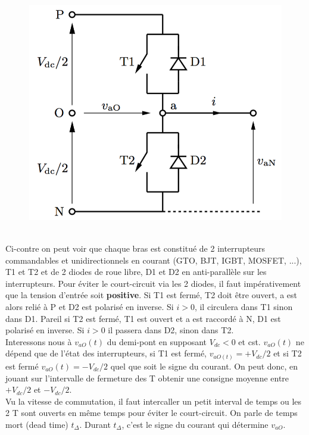 		\begin{figure}
		\vspace{-5mm}
		\includegraphics[scale=0.3]{ch4/8}
		\end{figure}
		\ \\ Ci-contre on peut voir que chaque bras est constitué de 2 interrupteurs commandables et unidirectionnels en courant (GTO, BJT, IGBT, MOSFET, ...), T1 et T2 et de 2 diodes de roue libre, D1 et D2 en  anti-parallèle sur les interrupteurs. Pour éviter le court-circuit via les 2 diodes, il faut impérativement que la tension d'entrée soit \textbf{positive}. Si T1 est fermé, T2 doit être ouvert, a est alors relié à P et D2 est polarisé en inverse. Si $i>0$, il circulera dans T1 sinon dans D1. Pareil si T2 est fermé, T1 est ouvert et a est raccordé à N, D1 est polarisé en inverse. Si $i>0$ il passera dans D2, sinon dans T2. \\
		
		Interessons nous à $v_{aO}(t)$ du demi-pont en supposant $V_{dc}<0$ et cst. $v_{aO}(t)$ ne dépend que de l'état des interrupteurs, si T1 est fermé, $v_{aO(t)} = + V_{dc}/2$ et si T2 est fermé $v_{aO}(t) = -V_{dc}/2$ quel que soit le signe du courant. On peut donc, en jouant sur l'intervalle de fermeture des T obtenir une consigne moyenne entre $+V_{dc}/2$ et $-V_{dc}/2$. \\
		
		Vu la vitesse de commutation, il faut intercaller un petit interval de temps ou les 2 T sont ouverts en même temps pour éviter le court-circuit. On parle de temps mort (dead time) $t_{\Delta}$. Durant $t_{\Delta}$, c'est le signe du courant qui détermine $v_{aO}$. 
		

